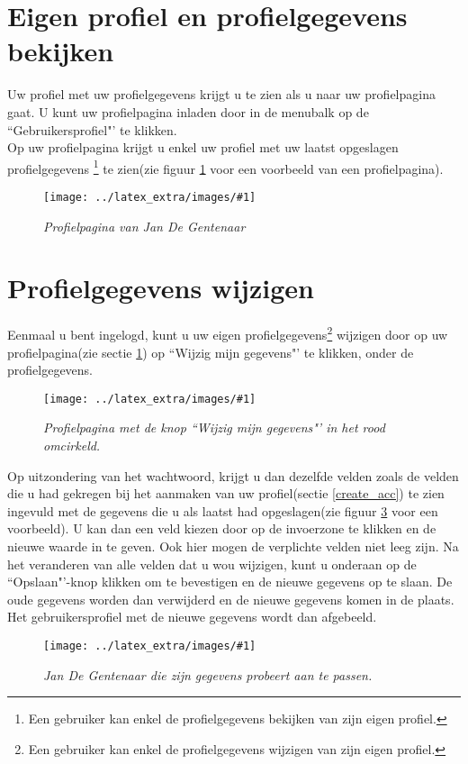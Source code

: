 \documentclass[11pt,twoside,a4paper]{report}
\newcommand*{\copyimageH}[4]{ 			%
	\begin{figure}[Ht]
	\texttt{[image: ../latex\_extra/images/\#1]}
	\caption{\textit{#4}}\label{#2}
	\end{figure}
}
\begin{document}
	
	\section{Eigen profiel en profielgegevens bekijken}\label{see_profile}
	Uw profiel met uw profielgegevens krijgt u te zien als u naar uw profielpagina gaat. U kunt uw profielpagina inladen door in de menubalk op de ``Gebruikersprofiel"' te klikken.\\
Op uw profielpagina krijgt u enkel uw profiel  met uw laatst opgeslagen profielgegevens \footnote{Een gebruiker kan enkel de profielgegevens bekijken van zijn eigen profiel.} te zien(zie figuur \ref{profile} voor een voorbeeld van een profielpagina).
	\copyimageH{profile.jpg}{profile}{\textwidth}{Profielpagina van Jan De Gentenaar}
	
	
	
	\section{Profielgegevens wijzigen}\label{change_acc}
	Eenmaal u bent ingelogd, kunt u uw eigen profielgegevens\footnote{Een gebruiker kan enkel de profielgegevens wijzigen van zijn eigen profiel.} wijzigen door op uw profielpagina(zie sectie \ref{see_profile}) op ``Wijzig mijn gegevens"' te klikken, onder de profielgegevens.
\copyimageH{profile_chge.jpg}{profile_chge}{\textwidth}{Profielpagina met de knop ``Wijzig mijn gegevens"' in het rood omcirkeld.}
Op uitzondering van het wachtwoord, krijgt u dan dezelfde velden zoals de velden die u had gekregen bij het aanmaken van uw profiel(sectie \ref{create_acc}) te zien ingevuld met de gegevens die u als laatst had opgeslagen(zie figuur \ref{edit_pge} voor een voorbeeld). U kan dan een veld kiezen door op de invoerzone te klikken en de nieuwe waarde in te geven. Ook hier mogen de verplichte velden \footnotemark[2] niet leeg zijn. Na het veranderen van alle velden dat u wou wijzigen, kunt u onderaan op de ``Opslaan"'-knop klikken om te bevestigen en de nieuwe gegevens op te slaan. De oude gegevens worden dan verwijderd en de nieuwe gegevens komen in de plaats. Het gebruikersprofiel met de nieuwe gegevens wordt dan afgebeeld.
\copyimageH{edit_pge.jpg}{edit_pge}{\textwidth}{Jan De Gentenaar die zijn gegevens probeert aan te passen.}
\end{document}
